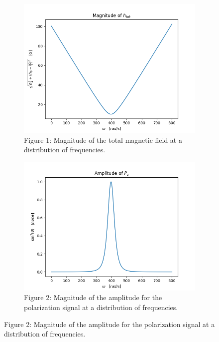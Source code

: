 \documentclass[%
 reprint,
 amsmath,
 amssymb,
 aps,
]{revtex4-1}
\begin{document}
	\begin{figure}

   		\centering
    		\begin{subfigure}[h]{0.4\textwidth}
        			\includegraphics[width=\textwidth]{magnitude-h_tot.png}
        			\caption{Figure 1: Magnitude of the total magnetic field at a distribution of frequencies.}
        			\label{fig:gull}
   		 \end{subfigure}


    		\begin{subfigure}[h]{0.4\textwidth}
      	 		\includegraphics[width=\textwidth]{amplitude-p_z.png}
       	 		\caption{Figure 2: Magnitude of the amplitude for the polarization signal at a distribution of 								frequencies.}
       	 		\label{fig:tiger}
		\end{subfigure}	

	\end{figure}
\end{document}
